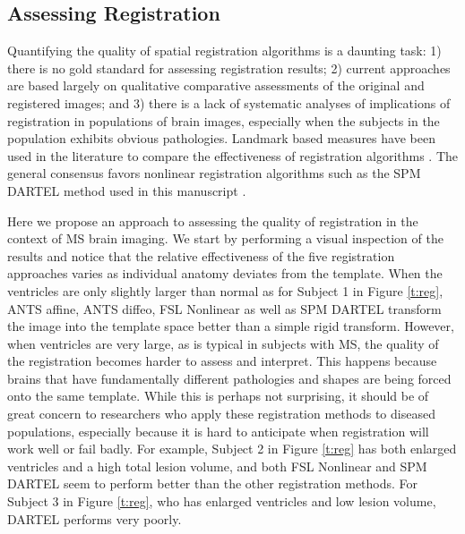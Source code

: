 \documentclass[10pt]{article}
\begin{document}
\subsection*{Assessing Registration}

Quantifying the quality of spatial registration algorithms is a
daunting task: 1) there is no gold standard for assessing
registration results; 2) current approaches are based largely on
qualitative comparative assessments of the original and registered
images; and 3) there is a lack of systematic analyses of implications of
registration in populations of brain images, especially when the subjects in the population
exhibits obvious pathologies. Landmark based measures have been used in the literature to compare the effectiveness of registration algorithms \cite{ardekani2005quantitative}. The general consensus favors nonlinear registration algorithms such as the SPM DARTEL method used in this manuscript \cite{klein2009evaluation}. 

Here we propose an approach to assessing the quality of registration in the context of MS brain imaging. We start by performing a visual inspection of the results and notice that the relative effectiveness of the five registration approaches varies as individual anatomy deviates from the template. When the ventricles are only slightly larger than normal as for Subject 1 in Figure \ref{t:reg}, ANTS affine, ANTS diffeo, FSL Nonlinear as well as SPM DARTEL transform the image into the template space better than a simple rigid transform. However, when ventricles are very large, as is typical in subjects with MS, the quality of the registration becomes harder to assess and interpret. This happens because brains that have fundamentally different pathologies and shapes are being forced onto the same template. While this is perhaps not surprising, it should be of great concern to researchers who apply these registration methods to diseased populations, especially because it is hard to anticipate when registration will work well or fail badly. For example, Subject 2 in Figure \ref{t:reg} has both enlarged ventricles and a high total lesion volume, and both FSL Nonlinear and SPM DARTEL seem to perform better than the other registration methods. For Subject 3 in Figure \ref{t:reg}, who has enlarged ventricles and low lesion volume, DARTEL performs very poorly. 
\end{document}
